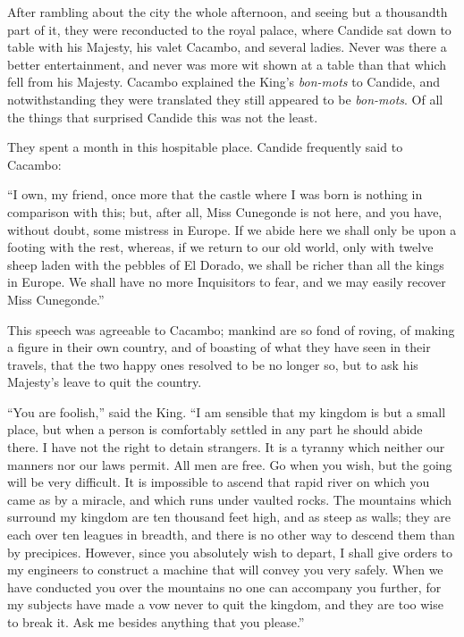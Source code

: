 After rambling about the city the whole afternoon, and seeing but a thousandth part of it, they were reconducted to the royal palace, where Candide sat down to table with his Majesty, his valet Cacambo, and several ladies. Never was there a better entertainment, and never was more wit shown at a table than that which fell from his Majesty. Cacambo explained the King's \textit{bon-mots} to Candide, and notwithstanding they were translated they still appeared to be \textit{bon-mots}. Of all the things that surprised Candide this was not the least.

They spent a month in this hospitable place. Candide frequently said to Cacambo:

``I own, my friend, once more that the castle where I was born is nothing in comparison with this; but, after all, Miss Cunegonde is not here, and you have, without doubt, some mistress in Europe. If we abide here we shall only be upon a footing with the rest, whereas, if we return to our old world, only with twelve sheep laden with the pebbles of El Dorado, we shall be richer than all the kings in Europe. We shall have no more Inquisitors to fear, and we may easily recover Miss Cunegonde.''

This speech was agreeable to Cacambo; mankind are so fond of roving, of making a figure in their own country, and of boasting of what they have seen in their travels, that the two happy ones resolved to be no longer so, but to ask his Majesty's leave to quit the country.

``You are foolish,'' said the King. ``I am sensible that my kingdom is but a small place, but when a person is comfortably settled in any part he should abide there. I have not the right to detain strangers. It is a tyranny which neither our manners nor our laws permit. All men are free. Go when you wish, but the going will be very difficult. It is impossible to ascend that rapid river on which you came as by a miracle, and which runs under vaulted rocks. The mountains which surround my kingdom are ten thousand feet high, and as steep as walls; they are each over ten leagues in breadth, and there is no other way to descend them than by precipices. However, since you absolutely wish to depart, I shall give orders to my engineers to construct a machine that will convey you very safely. When we have conducted you over the mountains no one can accompany you further, for my subjects have made a vow never to quit the kingdom, and they are too wise to break it. Ask me besides anything that you please.''

